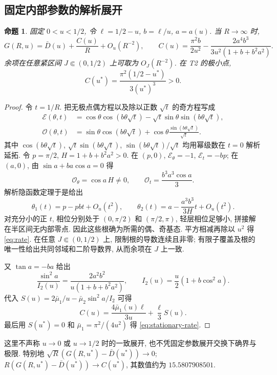\documentclass[UTF8]{ctexart}
\newtheorem{proposition}[theorem]{命题}
\begin{document}
\subsection{固定内部参数的解析展开}\label{sec:fixed-u}
\begin{proposition}\label{prop:fixed-u}
固定 $0<u<1/2$, 令 $\ell=1/2-u$, $b=\ell/u$, $a=a(u)$.
当 $R\to\infty$ 时,
\begin{equation}
 G(R,u)=\bar D(u)+\frac{C(u)}R+O_u(R^{-2}),\qquad
 C(u)=\frac{\pi^2b}{2u^2}-\frac{2a^4b^3}{3u^2(1+b+b^2a^2)}.\label{eq:rate}
\end{equation}
余项在任意紧区间 $J\Subset(0,1/2)$ 上可取为 $O_J(R^{-2})$.
在 T2 的极小点,
\begin{equation}
 C(u^*)=\frac{\pi^2(1/2-u^*)}{3(u^*)^3}>0.\label{eq:stationary-rate}
\end{equation}
\end{proposition}
\begin{proof}
令 $t=1/R$. 把无极点偶方程以及除以正数 $\sqrt t$ 的奇方程写成
\begin{align*}
 \mathcal E(\theta,t)&=\cos\theta\cos(b\theta\sqrt t)
 -\sqrt t\sin\theta\sin(b\theta\sqrt t),\\
 \mathcal O(\theta,t)&=\sin\theta\cos(b\theta\sqrt t)
 +\cos\theta\frac{\sin(b\theta\sqrt t)}{\sqrt t}.
\end{align*}
其中 $\cos(b\theta\sqrt t)$, $\sqrt t\sin(b\theta\sqrt t)$,
$\sin(b\theta\sqrt t)/\sqrt t$ 均用幂级数在 $t=0$ 解析延拓.
令 $p=\pi/2$, $H=1+b+b^2a^2>0$. 在 $(p,0)$,
$\mathcal E_\theta=-1$, $\mathcal E_t=-bp$;
在 $(a,0)$, 由 $\sin a+ba\cos a=0$ 得
\[
 \mathcal O_\theta=\cos a\,H\ne0,\qquad
 \mathcal O_t=\frac{b^3a^3\cos a}{3}.
\]
解析隐函数定理于是给出
\[
 \theta_1(t)=p-pbt+O_u(t^2),\qquad
 \theta_2(t)=a-\frac{a^3b^3}{3H}t+O_u(t^2).
\]
对充分小的正 $t$, 相位分别处于 $(0,\pi/2)$ 和 $(\pi/2,\pi)$,
轻层相位足够小, 拼接解在半区间无内部零点. 因此这些根确为所需的偶、奇基态.
平方相减再除以 $u^2$ 得 \eqref{eq:rate}.
在任意 $J\Subset(0,1/2)$ 上, 限制根的导数连续且非零;
有限子覆盖及根的唯一性给出共同邻域和二阶导数界, 从而余项在 $J$ 上一致.

又 $\tan a=-ba$ 给出
\[
 \frac{\sin^2a}{I_2(u)}=\frac{2a^2b^2}{u(1+b+b^2a^2)},\qquad
 I_2(u)=\frac u2(1+b\cos^2a).
\]
代入 $S(u)=2\bar\mu_1/u-\bar\mu_2\sin^2a/I_2$ 可得
\[
 C(u)=\frac{4\bar\mu_1(u)\ell}{3u}+\frac\ell3S(u).
\]
最后用 $S(u^*)=0$ 和 $\bar\mu_1=\pi^2/(4u^2)$ 得 \eqref{eq:stationary-rate}.
\end{proof}
这里不声称 $u\to0$ 或 $u\to1/2$ 时的一致展开, 也不凭固定参数展开交换下确界与极限.
特别地 $\sqrt R(G(R,u^*)-\bar D(u^*))\to0$;
$R(G(R,u^*)-\bar D(u^*))\to C(u^*)$, 其数值约为 $15.5807908501$.
\end{document}
